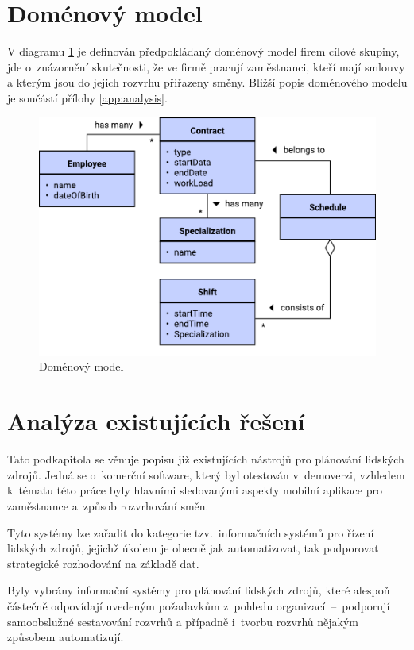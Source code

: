 \documentclass[a4paper,11pt,openany,twoside]{book}
\begin{document}
\section{Doménový model}

V diagramu \ref{fig:domainmodel} je definován předpokládaný doménový model firem cílové skupiny, jde o~znázornění skutečnosti, že ve firmě pracují zaměstnanci, kteří mají smlouvy a kterým jsou do jejich rozvrhu přiřazeny směny. Bližší popis doménového modelu je součástí přílohy \ref{app:analysis}.

\begin{figure}[h]
	\centering
	\includegraphics[scale=0.7]{img/domain-model.pdf}
	\caption{Doménový model}
	\label{fig:domainmodel}
\end{figure}

\section{Analýza existujících řešení}
\label{sec:existing}
Tato podkapitola se věnuje popisu již existujících nástrojů pro plánování lidských zdrojů. Jedná se o~komerční software, který byl otestován v~demoverzi, vzhledem k~tématu této práce byly hlavními sledovanými aspekty mobilní aplikace pro zaměstnance a~způsob rozvrhování směn.

Tyto systémy lze zařadit do kategorie tzv.~informačních systémů pro řízení lidských zdrojů, jejichž úkolem je obecně jak automatizovat, tak podporovat strategické rozhodování na základě dat. \cite{kovach2002administrative}

Byly vybrány informační systémy pro plánování lidských zdrojů, které alespoň částečně odpovídají uvedeným požadavkům z~pohledu organizací~–~podporují samoobslužné sestavování rozvrhů a případně i~tvorbu rozvrhů nějakým způsobem automatizují.
\end{document}
